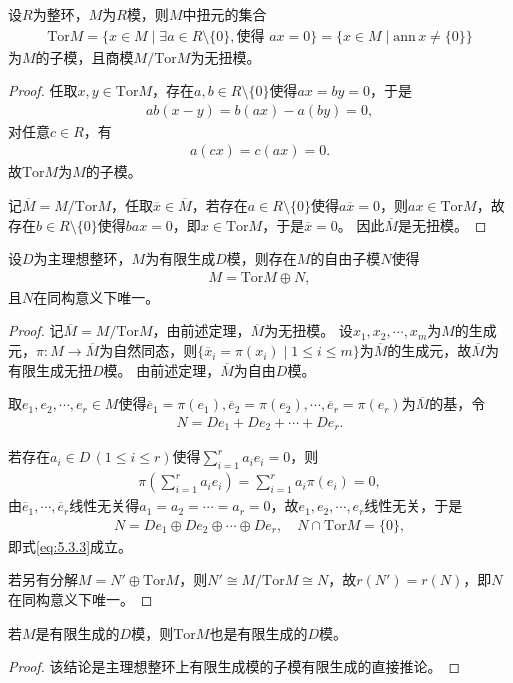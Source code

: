 \documentclass[../../main.tex]{subfiles}%
\begin{document}
\begin{theorem}
设$R$为整环，$M$为$R$模，则$M$中扭元的集合
\begin{align*}
\mathrm{Tor}M=\{x\in M\mid \exists a\in R\setminus\{0\},\text{使得 }ax=0\}=\{x\in M\mid \mathrm{ann}\,x\neq\{0\}\}
\end{align*}
为$M$的子模，且商模$M/\mathrm{Tor}M$为无扭模。
\end{theorem}
\begin{proof}
任取$x,y\in\mathrm{Tor}M$，存在$a,b\in R\setminus\{0\}$使得$ax=by=0$，于是
\begin{align*}
ab(x-y)=b(ax)-a(by)=0,
\end{align*}
对任意$c\in R$，有
\begin{align*}
a(cx)=c(ax)=0.
\end{align*}
故$\mathrm{Tor}M$为$M$的子模。

记$\overline{M}=M/\mathrm{Tor}M$，任取$\overline{x}\in\overline{M}$，若存在$a\in R\setminus\{0\}$使得$a\overline{x}=0$，则$ax\in\mathrm{Tor}M$，故存在$b\in R\setminus\{0\}$使得$bax=0$，即$x\in\mathrm{Tor}M$，于是$\overline{x}=0$。
因此$\overline{M}$是无扭模。
\end{proof}

\begin{theorem}
设$D$为主理想整环，$M$为有限生成$D$模，则存在$M$的自由子模$N$使得
\begin{align}\label{eq:5.3.3}
M=\mathrm{Tor}M\oplus N,
\end{align}
且$N$在同构意义下唯一。
\end{theorem}
\begin{proof}
记$\overline{M}=M/\mathrm{Tor}M$，由前述定理，$\overline{M}$为无扭模。
设$x_1,x_2,\cdots,x_m$为$M$的生成元，$\pi:M\to\overline{M}$为自然同态，则$\{\overline{x}_i=\pi(x_i)\mid 1\leqslant i\leqslant m\}$为$\overline{M}$的生成元，故$\overline{M}$为有限生成无扭$D$模。
由前述定理，$\overline{M}$为自由$D$模。

取$e_1,e_2,\cdots,e_r\in M$使得$\overline{e}_1=\pi(e_1),\overline{e}_2=\pi(e_2),\cdots,\overline{e}_r=\pi(e_r)$为$\overline{M}$的基，令
\begin{align*}
N=De_1+De_2+\cdots+De_r.
\end{align*}

若存在$a_i\in D\,(1\leqslant i\leqslant r)$使得$\sum_{i=1}^{r}a_ie_i=0$，则
\begin{align*}
\pi\left(\sum_{i=1}^{r}a_ie_i\right)=\sum_{i=1}^{r}a_i\pi(e_i)=0,
\end{align*}
由$\overline{e}_1,\cdots,\overline{e}_r$线性无关得$a_1=a_2=\cdots=a_r=0$，故$e_1,e_2,\cdots,e_r$线性无关，于是
\begin{align*}
N=De_1\oplus De_2\oplus\cdots\oplus De_r,\quad N\cap\mathrm{Tor}M=\{0\},
\end{align*}
即式\eqref{eq:5.3.3}成立。

若另有分解$M=N'\oplus\mathrm{Tor}M$，则$N'\cong M/\mathrm{Tor}M\cong N$，故$r(N')=r(N)$，即$N$在同构意义下唯一。
\end{proof}

\begin{corollary}
若$M$是有限生成的$D$模，则$\mathrm{Tor}M$也是有限生成的$D$模。
\end{corollary}
\begin{proof}
该结论是主理想整环上有限生成模的子模有限生成的直接推论。
\end{proof}
\end{document}
